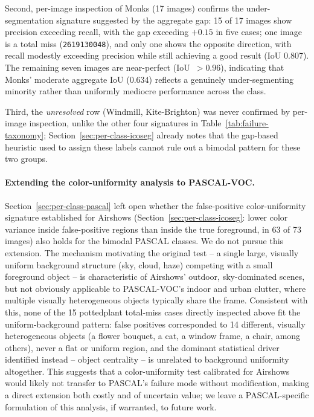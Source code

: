 Second, per-image inspection of Monks (17 images) confirms the under-segmentation signature suggested by the aggregate gap: 15 of 17 images show precision exceeding recall, with the gap exceeding $+0.15$ in five cases; one image is a total miss (\texttt{2619130048}), and only one shows the opposite direction, with recall modestly exceeding precision while still achieving a good result (IoU 0.807). The remaining seven images are near-perfect (IoU~$>0.96$), indicating that Monks' moderate aggregate IoU (0.634) reflects a genuinely under-segmenting minority rather than uniformly mediocre performance across the class.

Third, the \emph{unresolved} row (Windmill, Kite-Brighton) was never confirmed by per-image inspection, unlike the other four signatures in Table~\ref{tab:failure-taxonomy}; Section~\ref{sec:per-class-icoseg} already notes that the gap-based heuristic used to assign these labels cannot rule out a bimodal pattern for these two groups.

\paragraph{Extending the color-uniformity analysis to PASCAL-VOC.} Section~\ref{sec:per-class-pascal} left open whether the false-positive color-uniformity signature established for Airshows (Section~\ref{sec:per-class-icoseg}: lower color variance inside false-positive regions than inside the true foreground, in 63 of 73 images) also holds for the bimodal PASCAL classes. We do not pursue this extension. The mechanism motivating the original test -- a single large, visually uniform background structure (sky, cloud, haze) competing with a small foreground object -- is characteristic of Airshows' outdoor, sky-dominated scenes, but not obviously applicable to PASCAL-VOC's indoor and urban clutter, where multiple visually heterogeneous objects typically share the frame. Consistent with this, none of the 15 pottedplant total-miss cases directly inspected above fit the uniform-background pattern: false positives corresponded to 14 different, visually heterogeneous objects (a flower bouquet, a cat, a window frame, a chair, among others), never a flat or uniform region, and the dominant statistical driver identified instead -- object centrality -- is unrelated to background uniformity altogether. This suggests that a color-uniformity test calibrated for Airshows would likely not transfer to PASCAL's failure mode without modification, making a direct extension both costly and of uncertain value; we leave a PASCAL-specific formulation of this analysis, if warranted, to future work.

